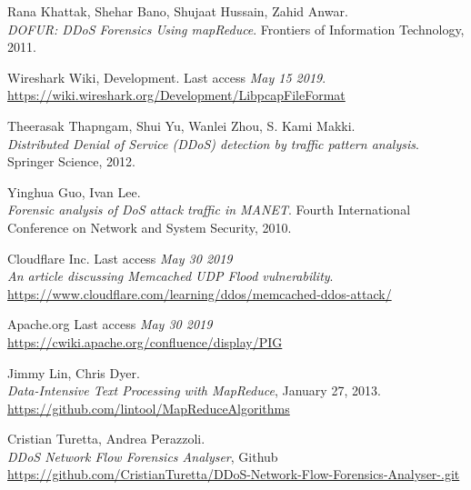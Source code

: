\newpage
\begin{thebibliography}{9}
Rana Khattak, Shehar Bano, Shujaat Hussain, Zahid Anwar. 
\\\textit{DOFUR: DDoS Forensics Using mapReduce}. Frontiers of Information Technology, 2011.

Wireshark Wiki, Development. Last access \textit{May 15 2019}.
\\\url{https://wiki.wireshark.org/Development/LibpcapFileFormat}

Theerasak Thapngam, Shui Yu, Wanlei Zhou, S. Kami Makki.
\\\textit{Distributed Denial of Service (DDoS) detection by traffic pattern analysis}.
Springer Science, 2012.

Yinghua Guo, Ivan Lee.
\\\textit{Forensic analysis of DoS attack traffic in MANET}. 
Fourth International Conference on Network and System Security, 2010.

Cloudflare Inc. Last access \textit{May 30 2019}
\\\textit{An article discussing Memcached UDP Flood vulnerability}. 
\\\url{https://www.cloudflare.com/learning/ddos/memcached-ddos-attack/}

Apache.org Last access \textit{May 30 2019}
\\\url{https://cwiki.apache.org/confluence/display/PIG}

Jimmy Lin, Chris Dyer.
\\\textit{Data-Intensive Text Processing with MapReduce}, January 27, 2013.
\\\url{https://github.com/lintool/MapReduceAlgorithms}

Cristian Turetta, Andrea Perazzoli.
\\\textit{DDoS Network Flow Forensics Analyser}, Github
\\\url{https://github.com/CristianTuretta/DDoS-Network-Flow-Forensics-Analyser-.git}

\end{thebibliography}